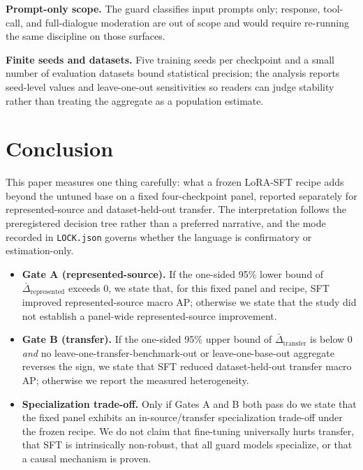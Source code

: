 \documentclass[sigconf,nonacm]{acmart}
\begin{document}
\textbf{Prompt-only scope.} The guard classifies input prompts only; response, tool-call, and full-dialogue moderation are out of scope and would require re-running the same discipline on those surfaces.

\textbf{Finite seeds and datasets.} Five training seeds per checkpoint and a small number of evaluation datasets bound statistical precision; the analysis reports seed-level values and leave-one-out sensitivities so readers can judge stability rather than treating the aggregate as a population estimate.

\section{Conclusion}
\label{sec:conclusion}

This paper measures one thing carefully: what a frozen LoRA-SFT recipe adds beyond the untuned base on a fixed four-checkpoint panel, reported separately for represented-source and dataset-held-out transfer. The interpretation follows the preregistered decision tree rather than a preferred narrative, and the mode recorded in \texttt{LOCK.json} governs whether the language is confirmatory or estimation-only.

\begin{itemize}
  \item \textbf{Gate A (represented-source).} If the one-sided 95\% lower bound of $\bar\Delta_{\text{represented}}$ exceeds 0, we state that, for this fixed panel and recipe, SFT improved represented-source macro AP; otherwise we state that the study did not establish a panel-wide represented-source improvement.
  \item \textbf{Gate B (transfer).} If the one-sided 95\% upper bound of $\bar\Delta_{\text{transfer}}$ is below 0 \emph{and} no leave-one-transfer-benchmark-out or leave-one-base-out aggregate reverses the sign, we state that SFT reduced dataset-held-out transfer macro AP; otherwise we report the measured heterogeneity.
  \item \textbf{Specialization trade-off.} Only if Gates A and B both pass do we state that the fixed panel exhibits an in-source/transfer specialization trade-off under the frozen recipe. We do not claim that fine-tuning universally hurts transfer, that SFT is intrinsically non-robust, that all guard models specialize, or that a causal mechanism is proven.
\end{itemize}
\end{document}
